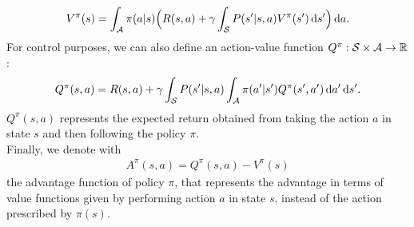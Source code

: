 \begin{align} V^{\pi}(s) = \int_{\mathcal{A}} \pi(a|s) \Big(R(s,a) + \gamma \int_{\mathcal{S}}P(s'|s,a)V^{\pi}(s')\,\mathrm{d} s' \Big) \,\mathrm{d} a. \label{eq:v}\end{align}
For control purposes, we can also define an action-value function $Q^{\pi}: \mathcal{S} \times \mathcal{A} \rightarrow \mathbb{R}$: \begin{align} Q^{\pi}(s,a) = R(s,a) + \gamma \int_{\mathcal{S}} P(s'|s,a) \int_{\mathcal{A}} \pi(a'|s') Q^{\pi}(s',a') \,\mathrm{d} a' \,\mathrm{d} s'.\end{align}
$Q^{\pi}(s,a)$ represents the expected return obtained from taking the action $a$ in state $s$ and then following the policy $\pi$. \\
\newline
Finally, we denote with
\begin{align} A^{\pi}(s,a) = Q^{\pi}(s,a) - V^{\pi}(s) \end{align}
the advantage function of policy $\pi$, that represents the advantage in terms of value functions given by performing action $a$ in state $s$, instead of the action prescribed by $\pi(s)$.

